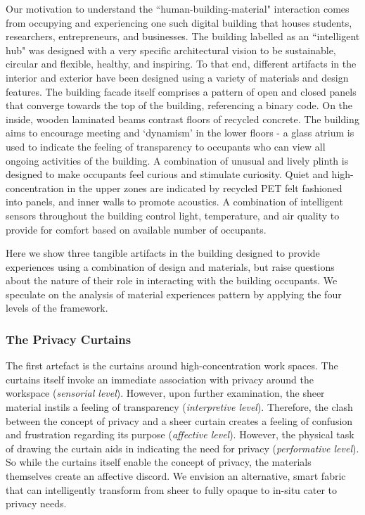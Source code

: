 \documentclass[manuscript, anonymous, review]{acmart}
\begin{document}
Our motivation to understand the ``human-building-material" interaction comes from occupying and experiencing one such digital building that houses students, researchers, entrepreneurs, and businesses. The building labelled as an ``intelligent hub" was designed with a very specific architectural vision to be sustainable, circular and flexible, healthy, and inspiring. To that end, different artifacts in the interior and exterior have been designed using a variety of materials and design features. The building facade itself comprises a pattern of open and closed panels that converge towards the top of the building, referencing a binary code. On the inside, wooden laminated beams contrast floors of recycled concrete. The building aims to encourage meeting and ‘dynamism’ in the lower floors - a glass atrium is used to indicate the feeling of transparency to occupants who can view all ongoing activities of the building. A combination of unusual and lively plinth is designed to make occupants feel curious and stimulate curiosity. Quiet and high-concentration in the upper zones are indicated by recycled PET felt fashioned into panels, and inner walls to promote acoustics. A combination of intelligent sensors throughout the building control light, temperature, and air quality to provide for comfort based on available number of occupants. 


Here we show three tangible artifacts in the building designed to provide experiences using a combination of design and materials, but raise questions about the nature of their role in interacting with the building occupants. We speculate on the analysis of material experiences pattern by applying the four levels of the framework.

\subsubsection*{The Privacy Curtains}
The first artefact is the curtains around high-concentration work spaces. The curtains itself invoke an immediate association with privacy around the workspace (\textit{sensorial level}). However, upon further examination, the sheer material instils a feeling of transparency (\textit{interpretive level}). Therefore, the clash between the concept of privacy and a sheer curtain creates a feeling of confusion and frustration regarding its purpose (\textit{affective level}). However, the physical task of drawing the curtain aids in indicating the need for privacy (\textit{performative level}). So while the curtains itself enable the concept of privacy, the materials themselves create an affective discord. We envision an alternative, smart fabric that can intelligently transform from sheer to fully opaque to in-situ cater to privacy needs.
\end{document}
